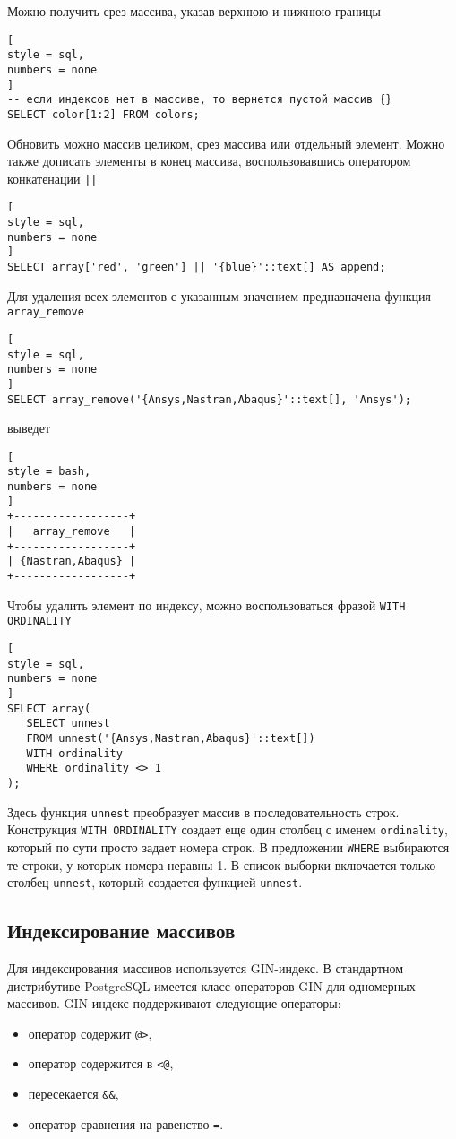 \documentclass[%
	11pt,
	a4paper,
	utf8,
		]{article}
\begin{document}
Можно получить срез массива, указав верхнюю и нижнюю границы
\begin{lstlisting}[
style = sql,
numbers = none
]
-- если индексов нет в массиве, то вернется пустой массив {}
SELECT color[1:2] FROM colors;
\end{lstlisting}

Обновить можно массив целиком, срез массива или отдельный элемент. Можно также дописать элементы в конец массива, воспользовавшись оператором конкатенации \texttt{||}
\begin{lstlisting}[
style = sql,
numbers = none
]
SELECT array['red', 'green'] || '{blue}'::text[] AS append;
\end{lstlisting}

Для удаления всех элементов с указанным значением предназначена функция \texttt{array\_remove}
\begin{lstlisting}[
style = sql,
numbers = none
]
SELECT array_remove('{Ansys,Nastran,Abaqus}'::text[], 'Ansys');
\end{lstlisting}
выведет
\begin{lstlisting}[
style = bash,
numbers = none
]
+------------------+
|   array_remove   |
+------------------+
| {Nastran,Abaqus} |
+------------------+
\end{lstlisting}

Чтобы удалить элемент по индексу, можно воспользоваться фразой \texttt{WITH ORDINALITY}
\begin{lstlisting}[
style = sql,
numbers = none
]
SELECT array(
   SELECT unnest
   FROM unnest('{Ansys,Nastran,Abaqus}'::text[])
   WITH ordinality
   WHERE ordinality <> 1
);
\end{lstlisting}

Здесь функция \texttt{unnest} преобразует массив в последовательность строк. Конструкция \texttt{WITH ORDINALITY} создает еще один столбец с именем \texttt{ordinality}, который по сути просто задает номера строк. В предложении \texttt{WHERE} выбираются те строки, у которых номера неравны 1. В список выборки включается только столбец \texttt{unnest}, который создается функцией \texttt{unnest}. 

\subsection{Индексирование массивов}

Для индексирования массивов используется GIN-индекс. В стандартном дистрибутиве PostgreSQL имеется класс операторов GIN для одномерных массивов. GIN-индекс поддерживают следующие операторы:
\begin{itemize}
	\item оператор содержит \verb|@>|,
	
	\item оператор содержится в \verb|<@|,
	
	\item пересекается \verb|&&|,
	
	\item оператор сравнения на равенство \verb|=|.
\end{itemize}
\end{document}

